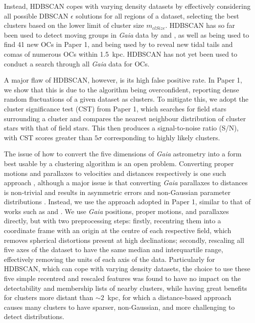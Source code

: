 Instead, HDBSCAN copes with varying density datasets by effectively considering all possible DBSCAN $\epsilon$ solutions for all regions of a dataset, selecting the best clusters based on the lower limit of cluster size $m_{clSize}$. HDBSCAN has so far been used to detect moving groups in \emph{Gaia} data by \cite{kounkel_untangling_2019} and \cite{kounkel_untangling_2020}, as well as being used to find 41 new OCs in Paper 1, and being used by \cite{tarricq_structural_2022} to reveal new tidal tails and comas of numerous OCs within 1.5~kpc. HDBSCAN has not yet been used to conduct a search through all \emph{Gaia} data for OCs.

A major flaw of HDBSCAN, however, is its high false positive rate. In Paper 1, we show that this is due to the algorithm being overconfident, reporting dense random fluctuations of a given dataset as clusters. To mitigate this, we adopt the cluster significance test (CST) from Paper 1, which searches for field stars surrounding a cluster and compares the nearest neighbour distribution of cluster stars with that of field stars. This then produces a signal-to-noise ratio (S/N), with CST scores greater than $5\sigma$ corresponding to highly likely clusters.

The issue of how to convert the five dimensions of \emph{Gaia} astrometry into a form best usable by a clustering algorithm is an open problem. Converting proper motions and parallaxes to velocities and distances respectively is one such approach \citep[e.g. as in][]{kounkel_untangling_2020, he_new_2022}, although a major issue is that converting \emph{Gaia} parallaxes to distances is non-trivial and results in asymmetric errors and non-Gaussian parameter distributions \citep{bailer-jones_estimating_2021}. Instead, we use the approach adopted in Paper 1, similar to that of works such as \cite{castro-ginard_new_2018} and \cite{liu_catalog_2019}. We use \emph{Gaia} positions, proper motions, and parallaxes directly, but with two preprocessing steps: firstly, recentring them into a coordinate frame with an origin at the centre of each respective field, which removes spherical distortions present at high declinations; secondly, rescaling all five axes of the dataset to have the same median and interquartile range, effectively removing the units of each axis of the data. Particularly for HDBSCAN, which can cope with varying density datasets, the choice to use these five simple recentred and rescaled features was found to have no impact on the detectability and membership lists of nearby clusters, while having great benefits for clusters more distant than $\sim2$~kpc, for which a distance-based approach causes many clusters to have sparser, non-Gaussian, and more challenging to detect distributions.

